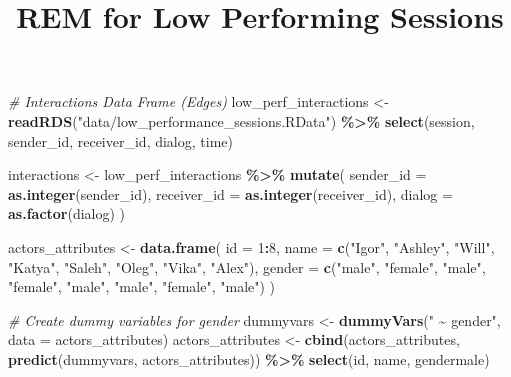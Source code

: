 \documentclass[
]{article}
\title{REM for Low Performing Sessions}
\author{}
\date{\vspace{-2.5em}}
\newenvironment{Shaded}{\begin{snugshade}}{\end{snugshade}}
\newcommand{\AttributeTok}[1]{\textcolor[rgb]{0.13,0.29,0.53}{#1}}
\newcommand{\CommentTok}[1]{\textcolor[rgb]{0.56,0.35,0.01}{\textit{#1}}}
\newcommand{\DecValTok}[1]{\textcolor[rgb]{0.00,0.00,0.81}{#1}}
\newcommand{\FunctionTok}[1]{\textcolor[rgb]{0.13,0.29,0.53}{\textbf{#1}}}
\newcommand{\NormalTok}[1]{#1}
\newcommand{\OtherTok}[1]{\textcolor[rgb]{0.56,0.35,0.01}{#1}}
\newcommand{\SpecialCharTok}[1]{\textcolor[rgb]{0.81,0.36,0.00}{\textbf{#1}}}
\newcommand{\StringTok}[1]{\textcolor[rgb]{0.31,0.60,0.02}{#1}}
\begin{document}
\maketitle

\begin{Shaded}
\begin{Highlighting}[]
\CommentTok{\# Interactions Data Frame (Edges)}
\NormalTok{low\_perf\_interactions }\OtherTok{\textless{}{-}} \FunctionTok{readRDS}\NormalTok{(}\StringTok{"data/low\_performance\_sessions.RData"}\NormalTok{) }\SpecialCharTok{\%\textgreater{}\%} 
  \FunctionTok{select}\NormalTok{(session, sender\_id, receiver\_id, dialog, time)}


\NormalTok{interactions }\OtherTok{\textless{}{-}}\NormalTok{ low\_perf\_interactions }\SpecialCharTok{\%\textgreater{}\%}
  \FunctionTok{mutate}\NormalTok{(}
    \AttributeTok{sender\_id =} \FunctionTok{as.integer}\NormalTok{(sender\_id),  }
    \AttributeTok{receiver\_id =} \FunctionTok{as.integer}\NormalTok{(receiver\_id), }
    \AttributeTok{dialog =} \FunctionTok{as.factor}\NormalTok{(dialog) }
\NormalTok{  )}



\NormalTok{actors\_attributes }\OtherTok{\textless{}{-}} \FunctionTok{data.frame}\NormalTok{(}
  \AttributeTok{id =} \DecValTok{1}\SpecialCharTok{:}\DecValTok{8}\NormalTok{,}
  \AttributeTok{name =} \FunctionTok{c}\NormalTok{(}\StringTok{"Igor"}\NormalTok{, }\StringTok{"Ashley"}\NormalTok{, }\StringTok{"Will"}\NormalTok{, }\StringTok{"Katya"}\NormalTok{, }\StringTok{"Saleh"}\NormalTok{, }\StringTok{"Oleg"}\NormalTok{, }\StringTok{"Vika"}\NormalTok{, }\StringTok{"Alex"}\NormalTok{),}
  \AttributeTok{gender =} \FunctionTok{c}\NormalTok{(}\StringTok{"male"}\NormalTok{, }\StringTok{"female"}\NormalTok{, }\StringTok{"male"}\NormalTok{, }\StringTok{"female"}\NormalTok{, }\StringTok{"male"}\NormalTok{, }\StringTok{"male"}\NormalTok{, }\StringTok{"female"}\NormalTok{, }\StringTok{"male"}\NormalTok{)}
\NormalTok{)}

\CommentTok{\# Create dummy variables for gender}
\NormalTok{dummyvars }\OtherTok{\textless{}{-}} \FunctionTok{dummyVars}\NormalTok{(}\StringTok{" \textasciitilde{} gender"}\NormalTok{, }\AttributeTok{data =}\NormalTok{ actors\_attributes)}
\NormalTok{actors\_attributes }\OtherTok{\textless{}{-}} \FunctionTok{cbind}\NormalTok{(actors\_attributes, }\FunctionTok{predict}\NormalTok{(dummyvars, actors\_attributes)) }\SpecialCharTok{\%\textgreater{}\%}
  \FunctionTok{select}\NormalTok{(id, name, gendermale)}
\end{Highlighting}
\end{Shaded}
\end{document}
